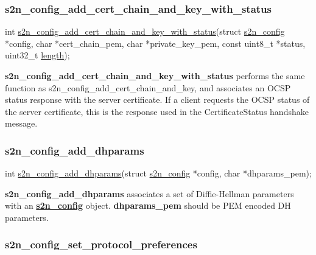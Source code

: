 \subsubsection*{s2n\+\_\+config\+\_\+add\+\_\+cert\+\_\+chain\+\_\+and\+\_\+key\+\_\+with\+\_\+status}


\begin{DoxyCode}
\textcolor{keywordtype}{int} \hyperlink{s2n_8h_a0275e457e9c62cf1d5b9a1126e853003}{s2n\_config\_add\_cert\_chain\_and\_key\_with\_status}(\textcolor{keyword}{struct} 
      \hyperlink{structs2n__config}{s2n\_config} *config, 
                                                  \textcolor{keywordtype}{char} *cert\_chain\_pem, 
                                                  \textcolor{keywordtype}{char} *private\_key\_pem,
                                                  \textcolor{keyword}{const} uint8\_t *status,
                                                  uint32\_t \hyperlink{crypto_2asn1_2asn1_8h_a5a2d57a92488e64c730cabc247c9d5b5}{length});
\end{DoxyCode}


{\bfseries s2n\+\_\+config\+\_\+add\+\_\+cert\+\_\+chain\+\_\+and\+\_\+key\+\_\+with\+\_\+status} performs the same function as s2n\+\_\+config\+\_\+add\+\_\+cert\+\_\+chain\+\_\+and\+\_\+key, and associates an O\+C\+SP status response with the server certificate. If a client requests the O\+C\+SP status of the server certificate, this is the response used in the Certificate\+Status handshake message.

\subsubsection*{s2n\+\_\+config\+\_\+add\+\_\+dhparams}


\begin{DoxyCode}
\textcolor{keywordtype}{int} \hyperlink{s2n_8h_a82513564c95dc7a4174c3d04eb043564}{s2n\_config\_add\_dhparams}(\textcolor{keyword}{struct} \hyperlink{structs2n__config}{s2n\_config} *config, 
                            \textcolor{keywordtype}{char} *dhparams\_pem);
\end{DoxyCode}


{\bfseries s2n\+\_\+config\+\_\+add\+\_\+dhparams} associates a set of Diffie-\/\+Hellman parameters with an {\bfseries \hyperlink{structs2n__config}{s2n\+\_\+config}} object. {\bfseries dhparams\+\_\+pem} should be P\+EM encoded DH parameters.

\subsubsection*{s2n\+\_\+config\+\_\+set\+\_\+protocol\+\_\+preferences}


